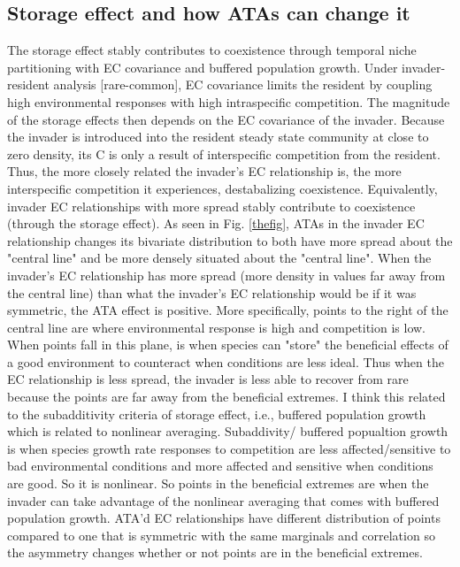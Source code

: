 \documentclass[letterpaper,11pt]{article}
\begin{document}
\subsection{Storage effect and how ATAs can change it}
The storage effect stably contributes to coexistence through 
temporal niche partitioning with EC covariance and buffered population growth.
Under invader-resident analysis [rare-common], EC covariance limits the resident by 
coupling high environmental responses with high intraspecific competition. The magnitude
of the storage effects then depends on the EC covariance of the invader. Because the 
invader is introduced into the resident steady state community at close to zero density, 
its C is only a result of interspecific competition from the resident. Thus, the more closely 
related the invader's EC relationship is, the more interspecific competition it experiences, 
destabalizing coexistence. Equivalently, invader EC relationships with more spread stably
contribute to coexistence (through the storage effect). As seen in Fig. \ref{thefig}, ATAs in 
the invader EC relationship changes its bivariate distribution to both have more spread 
about the "central line" and be more densely situated about the "central line".  
When the invader's EC relationship has more spread (more density in values far away from 
the central line) than what the invader's EC relationship would be if it was symmetric, 
the ATA effect is positive. More specifically, points to the right of the central line are where environmental response is high and competition is low. When points fall in this plane, is when species can "store" the beneficial effects of a good environment to counteract when conditions are less ideal. Thus when the EC relationship is less spread, the invader is less able to recover from rare because the points are far away from the beneficial extremes. 
I think this related to the subadditivity criteria of storage effect, i.e., buffered population growth which is related to nonlinear averaging. Subaddivity/ buffered popualtion growth is when species growth rate responses to competition are less affected/sensitive to bad environmental conditions and more affected and sensitive when conditions are good. So it is nonlinear. So points in the beneficial extremes are when the invader can take advantage of the nonlinear averaging that comes with buffered population growth. ATA'd EC relationships have different distribution of points compared to one that is symmetric with the same marginals and correlation so the asymmetry changes whether or not points are in the beneficial extremes.   
\end{document}
